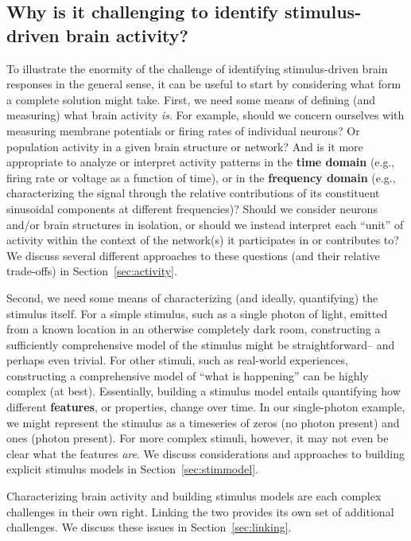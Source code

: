 \documentclass{llmxive}
\begin{document}
\subsection{Why is it challenging to identify stimulus-driven brain
  activity?}
To illustrate the enormity of the challenge of identifying
stimulus-driven brain responses in the general sense, it can be useful
to start by considering what form a complete solution might take.
First, we need some means of defining (and measuring) what brain
activity \textit{is}.  For example, should we concern ourselves with
measuring membrane potentials or firing rates of individual neurons?
Or population activity in a given brain structure or network?  And is
it more appropriate to analyze or interpret activity patterns in the
\textbf{time domain} (e.g., firing rate or voltage as a function of
time), or in the \textbf{frequency domain} (e.g., characterizing the
signal through the relative contributions of its constituent
sinusoidal components at different frequencies)?  Should we consider
neurons and/or brain structures in isolation, or should we instead
interpret each ``unit'' of activity within the context of the
network(s) it participates in or contributes to?  We discuss several
different approaches to these questions (and their relative
trade-offs) in Section~\ref{sec:activity}.

Second, we need some means of characterizing (and ideally,
quantifying) the stimulus itself.  For a simple stimulus, such as a
single photon of light, emitted from a known location in an otherwise
completely dark room, constructing a sufficiently comprehensive model
of the stimulus might be straightforward-- and perhaps even trivial.
For other stimuli, such as real-world experiences, constructing a
comprehensive model of ``what is happening'' can be highly complex (at
best).  Essentially, building a stimulus model entails quantifying how
different \textbf{features}, or properties, change over time.  In our
single-photon example, we might represent the stimulus as a timeseries
of zeros (no photon present) and ones (photon present).  For more
complex stimuli, however, it may not even be clear what the features
\textit{are}.  We discuss considerations and approaches to building
explicit stimulus models in Section~\ref{sec:stimmodel}.

Characterizing brain activity and building stimulus models are each
complex challenges in their own right.  Linking the two provides its
own set of additional challenges.  We discuss these issues in
Section~\ref{sec:linking}.
\end{document}
